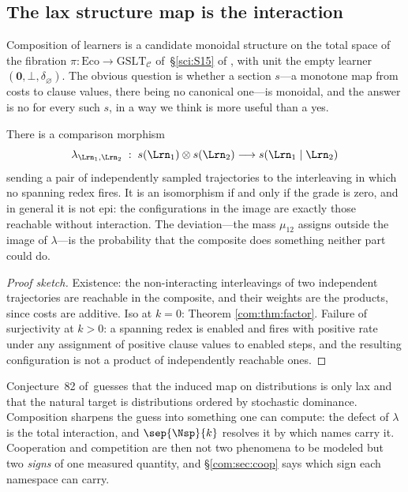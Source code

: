 \subsection{The lax structure map is the interaction}\label{com:S4.3}

Composition of learners is a candidate monoidal structure on the total space of the fibration
$\pi : \mathrm{Eco} \to \mathrm{GSLT}_{\mathcal{C}}$ of~\S\ref{sci:S15} of \chSci, with unit the
empty learner $(\mathbf{0}, \bot, \delta_{\varnothing})$. The obvious question is whether a
section $s$---a monotone map from costs to clause values, there being no canonical one---is
monoidal, and the answer is no for every such $s$, in a way we think is more useful than a yes.

\begin{proposition}\label{com:prop:lax}
There is a comparison morphism
\[
  \lambda_{\Lrn_1,\Lrn_2} \;:\; s(\Lrn_1) \otimes s(\Lrn_2) \longrightarrow s(\Lrn_1 \mid \Lrn_2)
\]
sending a pair of independently sampled trajectories to the interleaving in which no spanning
redex fires. It is an isomorphism if and only if the grade is zero, and in general it is not
epi: the configurations in the image are exactly those reachable without interaction. The
deviation---the mass $\mu_{12}$ assigns outside the image of $\lambda$---is the probability that
the composite does something neither part could do.
\end{proposition}

\begin{proof}[Proof sketch]
Existence: the non-interacting interleavings of two independent trajectories are reachable in the
composite, and their weights are the products, since costs are additive. Iso at $k=0$: Theorem
\ref{com:thm:factor}. Failure of surjectivity at $k>0$: a spanning redex is enabled and fires with
positive rate under any assignment of positive clause values to enabled steps, and the resulting
configuration is not a product of independently reachable ones.
\end{proof}

\begin{remark}\label{com:good-news-that-laxity}
Conjecture~82 of~\chSci guesses that the induced map on distributions is only lax and
that the natural target is distributions ordered by stochastic dominance. Composition sharpens
the guess into something one can compute: the defect of $\lambda$ is the total interaction, and
$\sep{\Nsp}{k}$ resolves it by which names carry it. Cooperation and competition are then not two
phenomena to be modeled but two \emph{signs} of one measured quantity, and \S\ref{com:sec:coop} says
which sign each namespace can carry.
\end{remark}

